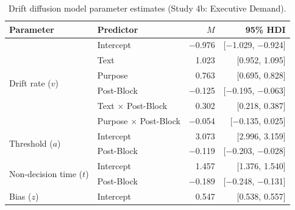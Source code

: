 \documentclass[pdflatex,sn-nature]{sn-jnl}
\begin{document}
\begin{appendices}
\begin{table}[htbp]
\caption{Drift diffusion model parameter estimates (Study 4b: Executive Demand).}
\label{tab:S21}
\begin{tabular*}{\textwidth}{@{\extracolsep{\fill}}llrr@{}}
\toprule
Parameter & Predictor & $M$ & 95\% HDI \\
\midrule
\multirow{6}{*}{Drift rate ($v$)} & Intercept & $-$0.976 & [$-$1.029, $-$0.924] \\
 & Text                              & 1.023  & [0.952, 1.095]   \\
 & Purpose                           & 0.763  & [0.695, 0.828]   \\
 & Post-Block                        & $-$0.125 & [$-$0.195, $-$0.063] \\
 & Text $\times$ Post-Block          & 0.302  & [0.218, 0.387]   \\
 & Purpose $\times$ Post-Block       & $-$0.054 & [$-$0.135, 0.025] \\
\midrule
\multirow{2}{*}{Threshold ($a$)} & Intercept & 3.073 & [2.996, 3.159] \\
 & Post-Block                        & $-$0.119 & [$-$0.203, $-$0.028] \\
\midrule
\multirow{2}{*}{Non-decision time ($t$)} & Intercept & 1.457 & [1.376, 1.540] \\
 & Post-Block                        & $-$0.189 & [$-$0.248, $-$0.131] \\
\midrule
Bias ($z$) & Intercept & 0.547 & [0.538, 0.557] \\
\bottomrule
\end{tabular*}
\end{table}


\end{appendices}
\end{document}
